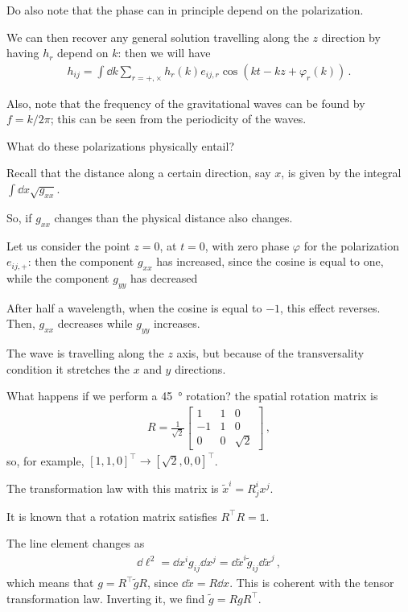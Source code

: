 \documentclass[main.tex]{subfiles}
\begin{document}
Do also note that the phase can in principle depend on the polarization. 

We can then recover any general solution travelling along the \(z\) direction by having \(h_r\) depend on \(k\): then  we will have 
%
\begin{align}
h_{ij} = \int  \dd{k} \sum_{r = +, \times } h_{r} (k) e_{ij, r} \cos(kt - kz + \varphi_{r}(k) ) 
\,.
\end{align}

Also, note that the frequency of the gravitational waves can be found by \(f = k / 2\pi \); this can be seen from the periodicity of the waves. 

What do these polarizations physically entail? 

Recall that the distance along a certain direction, say \(x\), is given by the integral \(\int \dd{x} \sqrt{g_{xx}}\). 

So, if \(g_{xx}\) changes than the physical distance also changes. 

Let us consider the point \(z=0\), at \(t=0\), with zero phase \(\varphi \) for the polarization \(e_{ij, +}\): then the component \(g_{xx}\) has increased, since the cosine is equal to one, while the component \(g_{yy}\) has decreased

After half a wavelength, when the cosine is equal to \(-1\), this effect reverses. Then, \(g_{xx}\) decreases while \(g_{yy} \) increases. 

The wave is travelling along the \(z\) axis, but because of the transversality condition it stretches the \(x\) and \(y\) directions. 

What happens if we perform a \SI{45}{\degree} rotation? the spatial rotation matrix is 
%
\begin{align}
R = \frac{1}{\sqrt{2}} \left[\begin{array}{ccc}
1 & 1 & 0 \\ 
-1 & 1 & 0 \\ 
0 & 0 & \sqrt{2}
\end{array}\right]
\,,
\end{align}
%
so, for example, \([1,1,0]^{\top} \rightarrow [\sqrt{2},0,0]^{\top}\). 

The transformation law with this matrix is \(\widetilde{x}^{i} = R_{j}^{i} x^{j}\).

It is known that a rotation matrix satisfies \(R^{\top} R = \mathbb{1}\). 

The line element changes as 
%
\begin{align}
\dd{\ell^2} = \dd{x^{i}} g_{ij} \dd{x^{j}} = \dd{\widetilde{x}^{i} } \widetilde{g}_{ij} \dd{\widetilde{x}^{j}}
\,,
\end{align}
%
which means that \(g = R^{\top} \widetilde{g} R\), since \(\dd{\widetilde{x}} = R \dd{x}\). This is coherent with the tensor transformation law. Inverting it, we find \(\widetilde{g} = R g R^{\top}\). 
\end{document}
